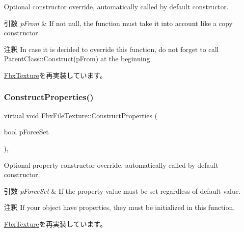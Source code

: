 Optional constructor override, automatically called by default constructor. 
\begin{DoxyParams}{引数}
{\em p\+From} & If not null, the function must take it into account like a copy constructor. \\
\hline
\end{DoxyParams}
\begin{DoxyRemark}{注釈}
In case it is decided to override this function, do not forget to call Parent\+Class\+::\+Construct(p\+From) at the beginning. 
\end{DoxyRemark}


\hyperlink{class_fbx_texture_afc81141345bc807a77dcbd9d6a0d8356}{Fbx\+Texture}を再実装しています。

\mbox{\label{class_fbx_file_texture_a698164ee49ac5fb2a5d5e3e7a2cb9e9f}} 
\subsubsection{\texorpdfstring{Construct\+Properties()}{ConstructProperties()}}
{\footnotesize\ttfamily virtual void Fbx\+File\+Texture\+::\+Construct\+Properties (\begin{DoxyParamCaption}\item[{bool}]{p\+Force\+Set }\end{DoxyParamCaption})\hspace{0.3cm}{\ttfamily [protected]}, {\ttfamily [virtual]}}

Optional property constructor override, automatically called by default constructor. 
\begin{DoxyParams}{引数}
{\em p\+Force\+Set} & If the property value must be set regardless of default value. \\
\hline
\end{DoxyParams}
\begin{DoxyRemark}{注釈}
If your object have properties, they must be initialized in this function. 
\end{DoxyRemark}


\hyperlink{class_fbx_texture_a851d5c4c96fb5023c004c88aeab2275b}{Fbx\+Texture}を再実装しています。

\mbox{\label{class_fbx_file_texture_a4ef7372132caebc8d1e5992efb894c9d}} 
